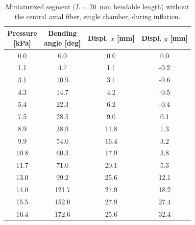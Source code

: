 \begin{table}[tbh]
  \caption{Miniaturized segment ($L=20$~mm bendable length) without the
  central axial fiber, single chamber, during inflation.}
  \label{tab:app-mini-nofiber}
  \centering
  \footnotesize
  \setlength{\tabcolsep}{5pt}
  \begin{tabular}{|c|c|c|c|}
    \hline
    \makecell{Pressure\\{[}kPa{]}} & \makecell{Bending\\angle [deg]} & \makecell{Displ. $x$\\{[}mm{]}} & \makecell{Displ. $y$\\{[}mm{]}} \\ \hline
    0.0 & 0.0 & 0.0 & 0.0 \\ \hline
    1.1 & 4.7 & 1.1 & -0.2 \\ \hline
    3.1 & 10.9 & 3.1 & -0.6 \\ \hline
    4.3 & 14.7 & 4.2 & -0.5 \\ \hline
    5.4 & 22.3 & 6.2 & -0.4 \\ \hline
    7.5 & 28.5 & 9.0 & 0.1 \\ \hline
    8.9 & 38.9 & 11.8 & 1.3 \\ \hline
    9.9 & 54.0 & 16.4 & 3.2 \\ \hline
    10.8 & 60.3 & 17.9 & 3.8 \\ \hline
    11.7 & 71.0 & 20.1 & 5.3 \\ \hline
    13.0 & 99.2 & 25.6 & 12.1 \\ \hline
    14.0 & 121.7 & 27.9 & 18.2 \\ \hline
    15.5 & 152.0 & 27.9 & 27.4 \\ \hline
    16.4 & 172.6 & 25.6 & 32.4 \\ \hline
  \end{tabular}
\end{table}

